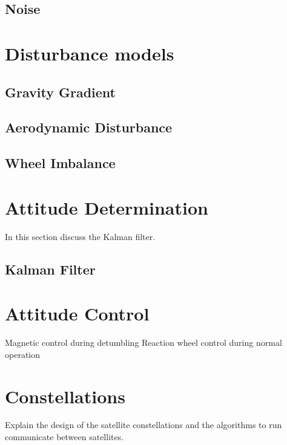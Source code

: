 \subsection{Noise}

\section{Disturbance models}
\subsection{Gravity Gradient}

\subsection{Aerodynamic Disturbance}
\cite{Steyn2014}

\subsection{Wheel Imbalance}

\section{Attitude Determination}
In this section discuss the Kalman filter.

\subsection{Kalman Filter}
\cite{Jones2017}

\section{Attitude Control}
Magnetic control during detumbling
Reaction wheel control during normal operation

\section{Constellations}
Explain the design of the satellite constellations and the algorithms to run communicate between satellites.

